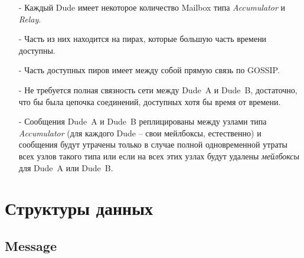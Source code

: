 \documentclass[11pt,a4paper]{article}
\newcommand{\term}[2]{\textit{#2}}
\newcommand{\Relay}{\term{relay}{Relay}}
\newcommand{\Acc}{\term{acc}{Accumulator}}
\begin{document}
\begin{itemize}
\item[-] Каждый Dude имеет некоторое количество Mailbox типа \Acc{} и \Relay{}.

\item[-] Часть из них находится на пирах, которые большую часть времени
  доступны.

\item[-] Часть доступных пиров имеет между собой прямую связь по GOSSIP.

\item[-] Не требуется полная связность сети между Dude~A и Dude~B, достаточно,
  что бы была цепочка соединений, доступных хотя бы время от времени.

\item[-] Сообщения Dude~A и Dude~B реплицированы между узлами типа \Acc{} (для
  каждого Dude -- свои мейлбоксы, естественно) и сообщения будут утрачены
    только в случае полной одновременной утраты всех узлов такого типа или если
    на всех этих узлах будут удалены \term{mailbox}{мейлбоксы} для Dude~A или
    Dude~B.
\end{itemize}

\pagebreak

\section{Структуры данных}

\subsection{Message}
\end{document}
